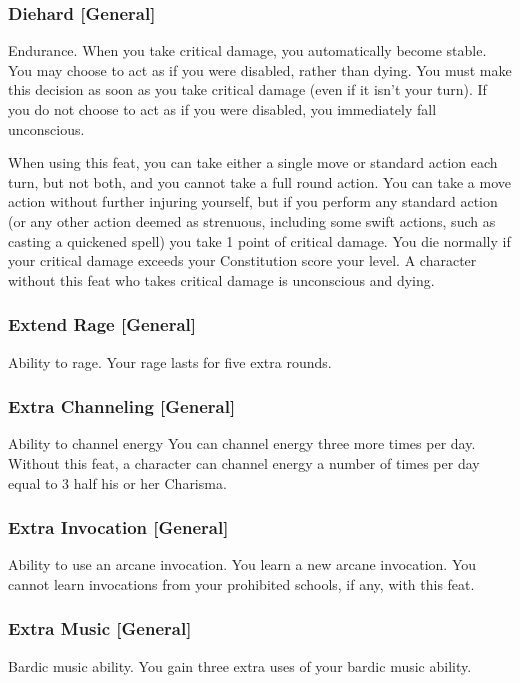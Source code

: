 \subsubsection{Diehard [General]}
 Endurance.
 When you take critical damage, you automatically become stable. You may choose to act as if you were disabled, rather than dying. You must make this decision as soon as you take critical damage (even if it isn't your turn). If you do not choose to act as if you were disabled, you immediately fall unconscious.
\par When using this feat, you can take either a single move or standard action each turn, but not both, and you cannot take a full round action. You can take a move action without further injuring yourself, but if you perform any standard action (or any other action deemed as strenuous, including some swift actions, such as casting a quickened spell) you take 1 point of critical damage. You die normally if your critical damage exceeds your Constitution score \add your level.
 A character without this feat who takes critical damage is unconscious and dying.

\subsubsection{Extend Rage [General]}
 Ability to rage.
 Your rage lasts for five extra rounds.

\subsubsection{Extra Channeling [General]}
 Ability to channel energy
 You can channel energy three more times per day. 
 Without this feat, a character can channel energy a number of times per day equal to 3 \add half his or her Charisma.

\subsubsection{Extra Invocation [General]}
 Ability to use an arcane invocation.
 You learn a new arcane invocation. You cannot learn invocations from your prohibited schools, if any, with this feat.

\subsubsection{Extra Music [General]}
 Bardic music ability.
 You gain three extra uses of your bardic music ability.

